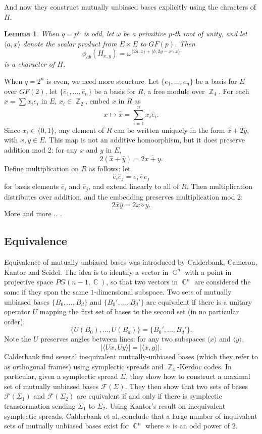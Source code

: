 \documentclass[a4paper]{article}
\DeclareMathOperator{\C}{\mathbb{C}}
\DeclareMathOperator{\Z}{\mathbb{Z}}
\newtheorem{lemma}{Lemma}
\begin{document}
  And now they construct mutually unbiased bases explicitly
  using the chracters of $H$.

  \begin{lemma}
    When $q = p^{n}$ is odd, let $\omega$ be a primitive
    $p$-th root of unity, and let $\langle a,x \rangle$ 
    denote the scalar product from $E \times E$ to $GF(p)$.
    Then
    \[
      \phi_{ab}(H_{x,y}) = \omega^{\langle 2a,x \rangle +
      \langle b,2y-x\circ x \rangle}
    \] 
    is a character of $H$.
  \end{lemma}

  When $q = 2^{n}$ is even, we need more structure. Let
  $\{e_1,\ldots,e_n\}$ be a basis for $E$ over $GF(2)$, let
  $\{\hat{e}_1, \ldots, \hat{e}_n\}$ be a basis for $R$, a
  free module over $\Z_4$. For each $x = \sum x_i e_i$ in
  $E$, $x_i \in \Z_2$, embed $x$ in $R$ as
  \[
    x \mapsto \hat{x} = \sum_{i=1}^{n} x_i \hat{e}_i.
  \] 
  Since $x_i \in \{0,1\}$, any element of $R$ can be written
  uniquely in the form $\hat{x} + 2 \hat{y}$, with $x,y \in
  E$. This map is not an additive homoorphism, but it does
  preserve addition mod 2: for any $x$ and $y$ in $E$,
  \[
    2(\hat{x}+\hat{y}) = 2\overline{x+y}.
  \] 
  Define multiplication on $R$ as follows: let
  \[
    \hat{e}_i \hat{e}_j = \overline{e_i \circ e_j}
  \] 
  for basis elements $\hat{e}_i$ and $\hat{e}_j$, and extend
  linearly to all of $R$. Then multiplication distributes
  over addition, and the embedding preserves multiplication
  mod 2:
  \[
    2\hat{x}\hat{y} = 2\overline{x \circ y}.
  \]
  More and more .. .

  \subsection{Equivalence}

  Equivalence of mutually unbiased bases was introduced by
  Calderbank, Cameron, Kantor and Seidel. The idea is to
  identify a vector in $\C^{n}$ with a point in projective
  space $PG(n-1,\C)$, so that two vectors in $\C^{n}$ are
  considered the same if they span the same $1$-dimensional
  subspace. Two sets of mutually unbiased bases
  $\{B_0,\ldots,B_d\}$ and $\{B_0',\ldots,B_d'\}$ are
  equivalent if there is a unitary operator $U$ mapping the
  first set of bases to the second set (in no particular
  order):
  \[
    \{U(B_0),\ldots,U(B_d)\} = \{B_0',\ldots,B_d'\}.
  \] 
  Note the $U$ preserves angles between lines: for any two
  subspaces $\langle x \rangle$ and $\langle y \rangle$,
  \[
    |\langle Ux, Uy \rangle| = |\langle x,y \rangle|.
  \] 
  Calderbank find several inequivalent mutually-unbiased
  bases (which they refer to as orthogonal frames) using
  symplectic spreads and $\Z_4$-Kerdoc codes. In particular,
  given a symplectic spread $\Sigma$, they show how to
  construct a maximal set of mutually unbiased bases
  $\mathcal F(\Sigma)$. They then show that two sets of
  bases $\mathcal{F}(\Sigma_1)$ and $\mathcal{F}(\Sigma_2)$ 
  are equivalent if and only if there is symplectic
  transformation sending $\Sigma_1$ to $\Sigma_2$. Using
  Kantor's result on inequivalent symplectic spreads,
  Calderbank et al, conclude that a large number of
  inquivalent sets of mutually unbiased bases exist for
  $\C^{n}$ where $n$ is an odd power of 2.
\end{document}
